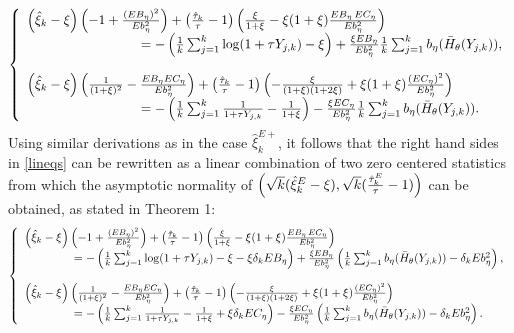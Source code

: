 \documentclass[twoside,leqno,11pt]{article}
\begin{document}
\begin{equation}
\left\{
\begin{array}{l}
\left(\hat{\xi}_k - \xi \right)\left(-1+ \frac{(EB_{\eta})^2}{Eb^2_{\eta}}\right)
+
\left({\hat{\tau}_k \over \tau}- 1 \right)\left({\xi \over 1+\xi} -\xi(1+\xi) \frac{EB_{\eta}\, EC_{\eta}}{Eb^2_{\eta}}\right) \\
\hspace{3cm} = - \left( {1 \over k}\sum_{j=1}^k \log (1+\tau Y_{j,k})-\xi \right)
+ {\xi EB_{\eta}\over Eb^2_{\eta}} {1 \over k}\sum_{j=1}^k
b_{\eta}(\bar{H}_{\theta}(Y_{j,k})), \\
\\
\left(\hat{\xi}_k - \xi \right)\left({1 \over (1+\xi)^2 }- \frac{EB_{\eta}EC_{\eta}}{Eb^2_{\eta}}\right)
+
\left({\hat{\tau}_k \over \tau}- 1 \right)\left(-{\xi \over (1+\xi)(1+2\xi)} +\xi(1+\xi) \frac{ (EC_{\eta})^2}{Eb^2_{\eta}}\right) \\
\hspace{3cm} = - \left( {1 \over k}\sum_{j=1}^k {1 \over 1+\tau Y_{j,k}} -{1 \over 1+\xi} \right)
- {\xi EC_{\eta}\over Eb^2_{\eta}} {1 \over k}\sum_{j=1}^k
b_{\eta}(\bar{H}_{\theta}(Y_{j,k})).
\end{array}
\right.
\label{lineqs}
\end{equation}
Using similar derivations as in the case $\hat{\xi}_k^{E+}$, it follows that the right hand sides in \eqref{lineqs} can be rewritten as a linear combination of two zero centered  statistics from which the asymptotic normality of $\left( \sqrt{k}(\hat{\xi}^{E}_k-\xi
), \sqrt{k}({\hat{\tau}^{E}_k \over \tau}-1) \right)$ can be obtained, as stated in Theorem 1: 
\begin{equation*}
\left\{
\begin{array}{l}
\left(\hat{\xi}_k - \xi \right)\left(-1+ \frac{(EB_{\eta})^2}{Eb^2_{\eta}}\right)
+
\left({\hat{\tau}_k \over \tau}- 1 \right)\left({\xi \over 1+\xi} -\xi(1+\xi) \frac{EB_{\eta}\, EC_{\eta}}{Eb^2_{\eta}}\right) \\
\hspace{1.5cm} = - \left( {1 \over k}\sum_{j=1}^k \log (1+\tau Y_{j,k})-\xi - \xi\delta_k EB_{\eta} \right)
+ {\xi EB_{\eta}\over Eb^2_{\eta}} \left({1 \over k}\sum_{j=1}^k
b_{\eta}(\bar{H}_{\theta}(Y_{j,k}))-\delta_k Eb^2_{\eta} \right), \\
\\
\left(\hat{\xi}_k - \xi \right)\left({1 \over (1+\xi)^2 }- \frac{EB_{\eta}EC_{\eta}}{Eb^2_{\eta}}\right)
+
\left({\hat{\tau}_k \over \tau}- 1 \right)\left(-{\xi \over (1+\xi)(1+2\xi)} +\xi(1+\xi) \frac{ (EC_{\eta})^2}{Eb^2_{\eta}}\right) \\
\hspace{1.5cm} = - \left( {1 \over k}\sum_{j=1}^k {1 \over 1+\tau Y_{j,k}} -{1 \over 1+\xi} +  \xi\delta_k EC_{\eta}\right)
- {\xi EC_{\eta}\over Eb^2_{\eta}} \left({1 \over k}\sum_{j=1}^k
b_{\eta}(\bar{H}_{\theta}(Y_{j,k}))-\delta_k Eb^2_{\eta}\right).
\end{array}
\right.
\end{equation*}
\end{document}

